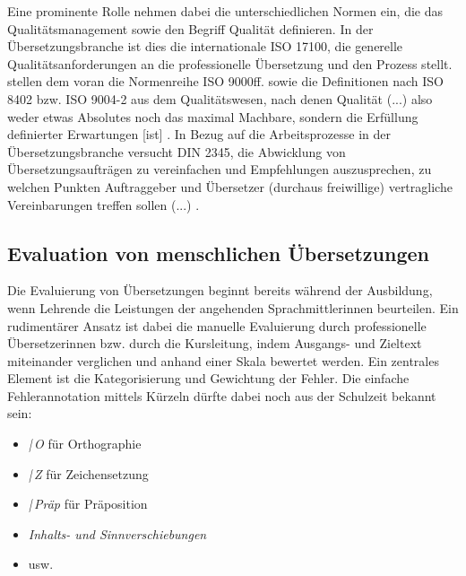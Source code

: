 
Eine prominente Rolle nehmen dabei die unterschiedlichen Normen ein, die das Qualitätsmanagement sowie den Begriff Qualität definieren. In der Übersetzungsbranche ist dies die internationale ISO 17100, die generelle Qualitätsanforderungen an die professionelle Übersetzung und den Prozess stellt. \citeauthor{schmitt_translationsqualitat_2007} stellen dem voran die Normenreihe ISO 9000ff. sowie die Definitionen nach ISO 8402 bzw. ISO 9004-2 aus dem Qualitätswesen, nach denen \glqq Qualität (...) also weder etwas Absolutes noch das maximal Machbare, sondern die Erfüllung definierter Erwartungen [ist]\grqq{} \citep[394\psq]{schmitt_translationsqualitat_2007}. In Bezug auf die Arbeitsprozesse in der Übersetzungsbranche versucht DIN 2345, \glqq die Abwicklung von Übersetzungsaufträgen zu vereinfachen und Empfehlungen auszusprechen, zu welchen Punkten Auftraggeber und Übersetzer (durchaus freiwillige) vertragliche Vereinbarungen treffen sollen (...)\grqq{} \citep[396]{schmitt_translationsqualitat_2007}.


\subsection{Evaluation von menschlichen Übersetzungen}
\label{K3:subsec:EvaHT}



Die Evaluierung von Übersetzungen beginnt bereits während der Ausbildung, wenn Lehrende die Leistungen der angehenden Sprachmittler{\textperiodcentered}innen beurteilen.
Ein rudimentärer Ansatz ist dabei die manuelle Evaluierung durch professionelle Übersetzer{\textperiodcentered}innen bzw. durch die Kursleitung, indem Ausgangs- und Zieltext miteinander verglichen und anhand einer Skala bewertet werden. Ein zentrales Element ist die Kategorisierung und Gewichtung der Fehler. Die einfache Fehlerannotation mittels Kürzeln dürfte dabei noch aus der Schulzeit bekannt sein: 

	\begin{itemize}
    
	\item \emph{|\,O} für Orthographie
    
    \item \emph{|\,Z} für Zeichensetzung
    
    \item \emph{|\,Präp} für Präposition
    
    \item \emph{Inhalts- und Sinnverschiebungen}
    
    \item usw.
    
	\end{itemize}
    
